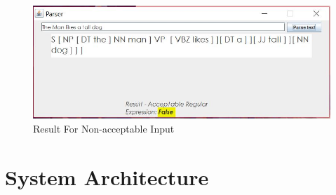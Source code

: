 \begin{figure}[ht]
	\begin{center}
		\advance\leftskip-3cm
		\advance\rightskip-3cm
		\includegraphics[keepaspectratio=true,scale=0.9]{__resources/false.jpg}
		\caption{Result For Non-acceptable Input}
		\label{onset}
	\end{center}
\end{figure}


\section*{System Architecture}

